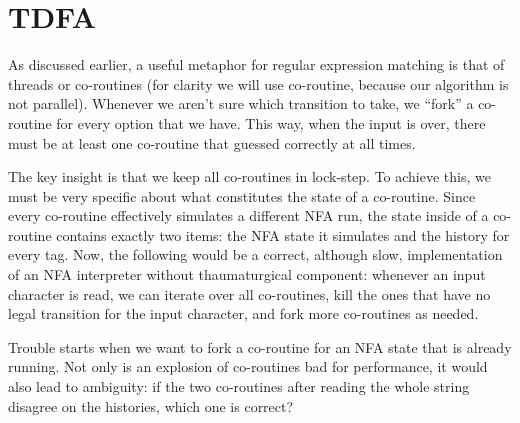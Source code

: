 \documentclass[11pt]{Thesis}
\theoremstyle{definition}
\newcommand{\seclabel}[1]{\label{sec:#1}}
\begin{document}
\section{TDFA}	\seclabel{dfa}

As discussed earlier, a useful metaphor for regular expression matching is that of 
threads\cite{Cox07a} or co-routines (for clarity we will use 
co-routine, because our algorithm is not parallel).
Whenever we aren't sure which transition to take,
we ``fork'' a co-routine for every option that we have. This way, when
the input is over, there must be at least one co-routine that guessed
correctly at all times. 

The key insight is that we keep all co-routines in lock-step. To achieve this,
we must be very specific about what constitutes the state of a co-routine.
Since every co-routine effectively simulates a different NFA run, the state
inside of a co-routine contains exactly two items: the NFA state it simulates
and the history for every tag. Now, the following would be a correct, although
slow, implementation of an NFA interpreter without thaumaturgical component:
whenever an input character is read, we can iterate over all co-routines, kill
the ones that have no legal transition for the input character, and fork more
co-routines as needed.

Trouble starts when we want to fork a co-routine for an NFA state that
is already running. Not only is an explosion of co-routines bad for
performance, it would also lead to ambiguity: if the two co-routines
after reading the whole string disagree on the histories, which one is correct?
\end{document}

